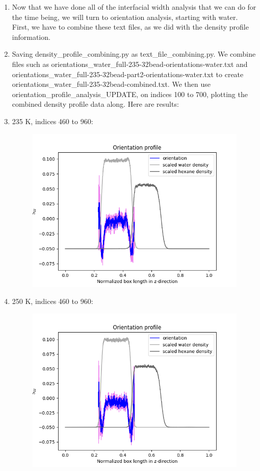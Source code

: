 \documentclass[12pt,reqno]{amsart}
\numberwithin{equation}{section}
\begin{document}
\begin{enumerate}
\item Now that we have done all of the interfacial width analysis that we can do for the time being, we will turn to orientation analysis, starting with water.  First, we have to combine these text files, as we did with the density profile information.  
\item Saving density\_profile\_combining.py as text\_file\_combining.py.  We combine files such as orientations\_water\_full-235-32bead-orientations-water.txt and orientations\_water\_full-235-32bead-part2-orientations-water.txt to create orientations\_water\_full-235-32bead-combined.txt.  We then use orientation\_profile\_analysis\_UPDATE, on indices 100 to 700, plotting the combined density profile data along.  Here are results:

\item 235 K, indices 460 to 960:  

\begin{figure}[H]
\centering
\includegraphics[scale=0.6]{full-235-32bead-water-orientation}
\end{figure}

\item 250 K, indices 460 to 960:  

\begin{figure}[H]
\centering
\includegraphics[scale=0.6]{full-250-32bead-water-orientation}
\end{figure}


\end{enumerate}
\end{document}
